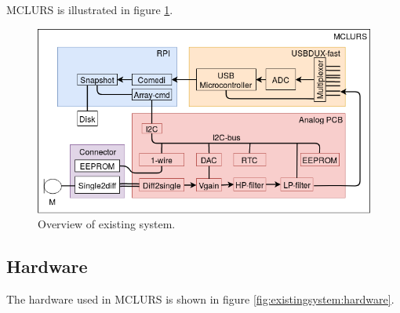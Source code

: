 MCLURS is illustrated in figure \ref{fig:existingsystem:overview}. 


\begin{figure}[H]
	\centering
	\includegraphics[width=1\textwidth]{figures/existing-batboxv1} 
	\caption{Overview of existing system.}\label{fig:existingsystem:overview}
\end{figure}

\subsection{Hardware}\label{sec:existingsystem:hardware}
The hardware used in MCLURS is shown in figure \ref{fig:existingsystem:hardware}.

